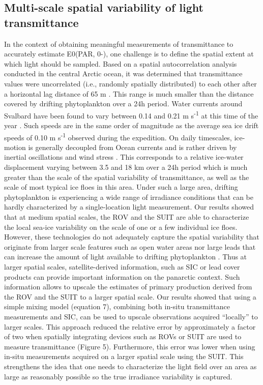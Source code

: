 \documentclass[draft]{agujournal2018}
\begin{document}
\subsection{Multi-scale spatial variability of light transmittance}

In the context of obtaining meaningful measurements of transmittance to accurately estimate E0(PAR, 0-), one challenge is to define the spatial extent at which light should be sampled. Based on a spatial autocorrelation analysis conducted in the central Arctic ocean, it was determined that transmittance values were uncorrelated (i.e., randomly spatially distributed) to each other after a horizontal lag distance of 65 m \citep{Lange2017b}. This range is much smaller than the distance covered by drifting phytoplankton over a 24h period. Water currents around Svalbard have been found to vary between 0.14 and 0.21 m s\textsuperscript{-1} at this time of the year \citep{Meyer2017}. Such speeds are in the same order of magnitude as  the average sea ice drift speeds of 0.10 m s\textsuperscript{-1} observed during the expedition. On daily timescales, ice-motion is generally decoupled from Ocean currents and is rather driven by inertial oscillations and wind stress \citep{Park2016}. This corresponds to a relative ice-water displacement varying between 3.5 and 18 km over a 24h period which is much greater than the scale of the spatial variability of transmittance, as well as the scale of most typical ice floes in this area. Under such a large area, drifting phytoplankton is experiencing a wide range of irradiance conditions that can be hardly characterized by a single-location light measurement. Our results showed that at medium spatial scales, the ROV and the SUIT are able to characterize the local sea-ice variability on the scale of one or a few individual ice floes. However, these technologies do not adequately capture the spatial variability that originate from larger scale features such as open water areas nor large leads that can increase the amount of light available to drifting phytoplankton \citep{Assmy2017}. Thus at larger spatial scales, satellite-derived information, such as SIC or lead cover products can provide important information on the panarctic context. Such information allows to upscale the estimates of primary production derived from the ROV and the SUIT to a larger spatial scale. Our results showed that using a simple mixing model (equation 7), combining both in-situ transmittance measurements and SIC, can be used to upscale observations acquired “locally” to larger scales. This approach reduced the relative error by approximately a factor of two when spatially integrating devices such as ROVs or SUIT are used to measure transmittance (Figure 5). Furthermore, this error was lower when using in-situ measurements acquired on a larger spatial scale using the SUIT. This strengthens the idea that one needs to characterize the light field over an area as large as reasonably possible so the true irradiance variability is captured.
\end{document}

